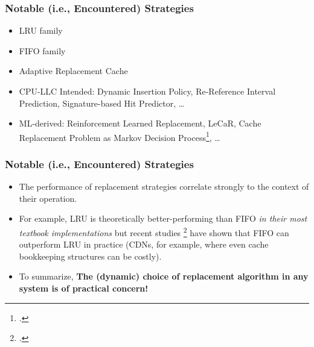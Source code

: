 \documentclass{beamer}
\begin{document}
\begin{frame}
    \frametitle{Notable (i.e., Encountered) Strategies}
    \begin{itemize}
        \item LRU family
        \item FIFO family
        \item Adaptive Replacement Cache
        \item CPU-LLC Intended: Dynamic Insertion Policy, Re-Reference Interval Prediction, Signature-based Hit Predictor, \dots
        \item ML-derived: Reinforcement Learned Replacement, LeCaR, Cache Replacement Problem as Markov Decision Process\footcite{GWHSZ.2014.CacheReplAsMDP-QLearning},
              \dots
    \end{itemize}
\end{frame}

\begin{frame}
    \frametitle{Notable (i.e., Encountered) Strategies}
    \begin{itemize}
        \item The performance of replacement strategies correlate strongly to the context of their operation.
        \item For example, LRU is theoretically better-performing than FIFO \textit{in their most textbook implementations} but recent studies
              \footcites{EHOFK.2020.IBM-LRUvsFIFO}{YQZYR.2023.FIFOwithTwist} have shown that FIFO can outperform LRU in practice (CDNs, for example, where even cache
              bookkeeping structures can be costly).
        \item To summarize, \textbf{The (dynamic) choice of replacement algorithm in any system is of practical concern!}
    \end{itemize}
\end{frame}
\end{document}
